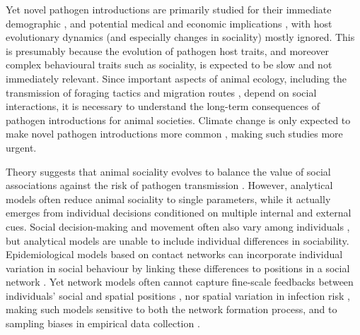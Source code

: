Yet novel pathogen introductions are primarily studied for their immediate demographic \autocite{fey2015}, and potential medical \autocite{wille2022,chandler2021,kuchipudi2022,levi2012} and economic implications \autocite[][]{keeling2001,goulson2015,jolles2021}, with host evolutionary dynamics (and especially changes in sociality) mostly ignored.
This is presumably because the evolution of pathogen host traits, and moreover complex behavioural traits such as sociality, is expected to be slow and not immediately relevant.
Since important aspects of animal ecology, including the transmission of foraging tactics \autocite{klump2021} and migration routes \autocite{jesmer2018,guttal2010}, depend on social interactions, it is necessary to understand the long-term consequences of pathogen introductions for animal societies.
Climate change is only expected to make novel pathogen introductions more common \autocite{sanderson2020,carlson2022a}, making such studies more urgent.

Theory suggests that animal sociality evolves to balance the value of social associations against the risk of pathogen transmission \autocite[][]{bonds2005,prado2009,ashby2022}.
However, analytical models often reduce animal sociality to single parameters, while it actually emerges from individual decisions conditioned on multiple internal and external cues.
Social decision-making and movement often also vary among individuals \autocite{tanner2012,wolf2012,spiegel2017,gartland2021}, but analytical models are unable to include individual differences in sociability.
Epidemiological models based on contact networks can incorporate individual variation in social behaviour by linking these differences to positions in a social network \autocite{white2017,albery2021,albery2020}.
Yet network models often cannot capture fine-scale feedbacks between individuals' social and spatial positions \autocite{albery2021,albery2020}, nor spatial variation in infection risk \autocite{albery2022}, making such models sensitive to both the network formation process, and to sampling biases in empirical data collection \autocite[][]{white2017}.

